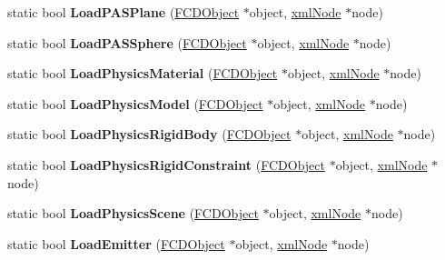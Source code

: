 \begin{DoxyCompactItemize}
\item 
\hypertarget{classFArchiveXML_ae534146f87505d3702730261a143ffb4}{
static bool {\bfseries LoadPASPlane} (\hyperlink{classFCDObject}{FCDObject} $\ast$object, \hyperlink{struct__xmlNode}{xmlNode} $\ast$node)}
\label{classFArchiveXML_ae534146f87505d3702730261a143ffb4}

\item 
\hypertarget{classFArchiveXML_a2f2b3f695d4cafb82c1107a450736f23}{
static bool {\bfseries LoadPASSphere} (\hyperlink{classFCDObject}{FCDObject} $\ast$object, \hyperlink{struct__xmlNode}{xmlNode} $\ast$node)}
\label{classFArchiveXML_a2f2b3f695d4cafb82c1107a450736f23}

\item 
\hypertarget{classFArchiveXML_abbc224a6cb3d7c5445358199fe5f587f}{
static bool {\bfseries LoadPhysicsMaterial} (\hyperlink{classFCDObject}{FCDObject} $\ast$object, \hyperlink{struct__xmlNode}{xmlNode} $\ast$node)}
\label{classFArchiveXML_abbc224a6cb3d7c5445358199fe5f587f}

\item 
\hypertarget{classFArchiveXML_a04cb9c9989157dc2567e75be5470aca0}{
static bool {\bfseries LoadPhysicsModel} (\hyperlink{classFCDObject}{FCDObject} $\ast$object, \hyperlink{struct__xmlNode}{xmlNode} $\ast$node)}
\label{classFArchiveXML_a04cb9c9989157dc2567e75be5470aca0}

\item 
\hypertarget{classFArchiveXML_ac3a5fcb3474dfb503c68cd9387abe180}{
static bool {\bfseries LoadPhysicsRigidBody} (\hyperlink{classFCDObject}{FCDObject} $\ast$object, \hyperlink{struct__xmlNode}{xmlNode} $\ast$node)}
\label{classFArchiveXML_ac3a5fcb3474dfb503c68cd9387abe180}

\item 
\hypertarget{classFArchiveXML_a0512e8df437af58424e0bf64abcee55d}{
static bool {\bfseries LoadPhysicsRigidConstraint} (\hyperlink{classFCDObject}{FCDObject} $\ast$object, \hyperlink{struct__xmlNode}{xmlNode} $\ast$node)}
\label{classFArchiveXML_a0512e8df437af58424e0bf64abcee55d}

\item 
\hypertarget{classFArchiveXML_ae7dd322663acecf932d959b69af4e00d}{
static bool {\bfseries LoadPhysicsScene} (\hyperlink{classFCDObject}{FCDObject} $\ast$object, \hyperlink{struct__xmlNode}{xmlNode} $\ast$node)}
\label{classFArchiveXML_ae7dd322663acecf932d959b69af4e00d}

\item 
\hypertarget{classFArchiveXML_a24ce1334527d99a8d177d7596548a234}{
static bool {\bfseries LoadEmitter} (\hyperlink{classFCDObject}{FCDObject} $\ast$object, \hyperlink{struct__xmlNode}{xmlNode} $\ast$node)}
\label{classFArchiveXML_a24ce1334527d99a8d177d7596548a234}


\end{DoxyCompactItemize}
